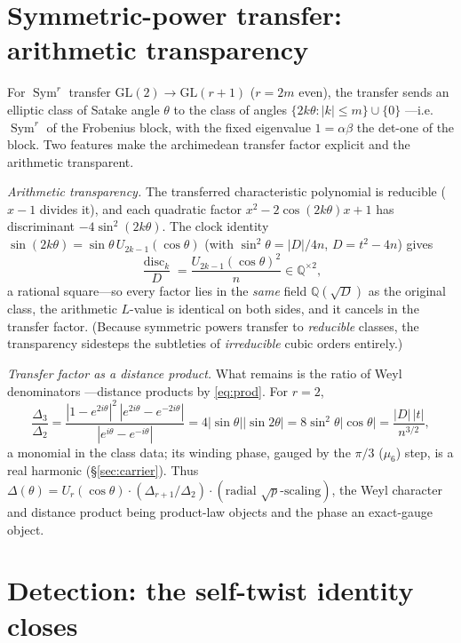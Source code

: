 \documentclass[11pt]{article}
\theoremstyle{definition}
\newcommand{\Sym}{\operatorname{Sym}}
\begin{document}
\section{Symmetric-power transfer: arithmetic transparency}\label{sec:fl}

For $\Sym^r$ transfer $\mathrm{GL}(2)\to\mathrm{GL}(r+1)$ ($r=2m$ even), the transfer sends an
elliptic class of Satake angle $\theta$ to the class of angles $\{2k\theta:|k|\le m\}\cup\{0\}$
---i.e. $\Sym^r$ of the Frobenius block, with the fixed eigenvalue $1=\alpha\beta$ the det-one of
the block. Two features make the archimedean transfer factor explicit and the arithmetic transparent.

\emph{Arithmetic transparency.} The transferred characteristic polynomial is reducible ($x-1$
divides it), and each quadratic factor $x^2-2\cos(2k\theta)x+1$ has discriminant $-4\sin^2(2k\theta)$.
The clock identity $\sin(2k\theta)=\sin\theta\,U_{2k-1}(\cos\theta)$ (with $\sin^2\theta=|D|/4n$,
$D=t^2-4n$) gives
\[
  \frac{\operatorname{disc}_k}{D}=\frac{U_{2k-1}(\cos\theta)^2}{n}\in\mathbb Q^{\times2},
\]
a rational square---so every factor lies in the \emph{same} field $\mathbb Q(\sqrt D)$ as the
original class, the arithmetic $L$-value is identical on both sides, and it cancels in the transfer
factor. (Because symmetric powers transfer to \emph{reducible} classes, the transparency sidesteps the
subtleties of \emph{irreducible} cubic orders entirely.)

\emph{Transfer factor as a distance product.} What remains is the ratio of Weyl denominators
---distance products by \eqref{eq:prod}. For $r=2$,
\[
  \frac{\Delta_3}{\Delta_2}
  =\frac{|1-e^{2i\theta}|^2\,|e^{2i\theta}-e^{-2i\theta}|}{|e^{i\theta}-e^{-i\theta}|}
  =4|\sin\theta||\sin2\theta|=8\sin^2\theta|\cos\theta|=\frac{|D|\,|t|}{n^{3/2}},
\]
a monomial in the class data; its winding phase, gauged by the $\pi/3$ ($\mu_6$) step, is a real
harmonic (\S\ref{sec:carrier}). Thus $\Delta(\theta)=U_r(\cos\theta)\cdot(\Delta_{r+1}/\Delta_2)
\cdot(\text{radial }\sqrt p\text{-scaling})$, the Weyl character and distance product being product-law
objects and the phase an exact-gauge object.

\section{Detection: the self-twist identity closes}\label{sec:detect}
\end{document}

